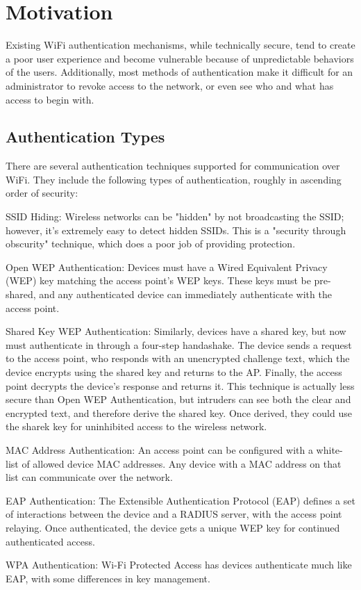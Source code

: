 \section{Motivation}
\label{section:motivation}
Existing WiFi authentication mechanisms, while technically secure, tend to create a poor user
experience and become vulnerable because of unpredictable behaviors of the users. Additionally,
most methods of authentication make it difficult for an administrator to revoke access to the
network, or even see who and what has access to begin with.

\subsection{Authentication Types}
There are several authentication techniques supported for communication over WiFi. They include
the following types of authentication, roughly in ascending order of security: \cite{WifiAuthenticationTypes}
\begin{description}
  \item{SSID Hiding:} Wireless networks can be "hidden" by not broadcasting the SSID; however, it's extremely easy to detect hidden SSIDs. This is a "security through obscurity" technique, which does a poor job of providing protection.
  \item{Open WEP Authentication:} Devices must have a Wired Equivalent Privacy (WEP) key matching the access point's WEP keys. These keys must be pre-shared, and any authenticated device can immediately authenticate with the access point.
  \item{Shared Key WEP Authentication:} Similarly, devices have a shared key, but now must authenticate in through a four-step handashake. The device sends a request to the access point, who responds with an unencrypted challenge text, which the device encrypts using the shared key and returns to the AP. Finally, the access point decrypts the device's response and returns it. This technique is actually less secure than Open WEP Authentication, but intruders can see both the clear and encrypted text, and therefore derive the shared key. Once derived, they could use the sharek key for uninhibited access to the wireless network.
  \item{MAC Address Authentication:} An access point can be configured with a white-list of allowed device MAC addresses. Any device with a MAC address on that list can communicate over the network.
  \item{EAP Authentication:} The Extensible Authentication Protocol (EAP) defines a set of interactions between the device and a RADIUS server, with the access point relaying. Once authenticated, the device gets a unique WEP key for continued authenticated access.
  \item{WPA Authentication:} Wi-Fi Protected Access has devices authenticate much like EAP, with some differences in key management.
\end{description}

